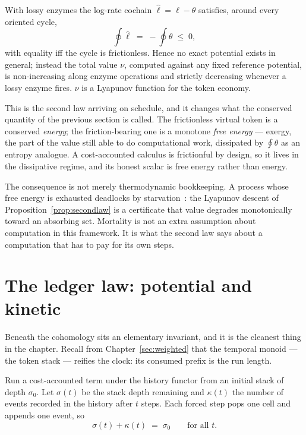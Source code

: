 \begin{proposition}
\label{prop:secondlaw}
With lossy enzymes the log-rate cochain $\hat\ell = \ell - \theta$
satisfies, around every oriented cycle,
\[
  \oint \hat\ell \;=\; -\oint \theta \;\leq\; 0,
\]
with equality iff the cycle is frictionless.  Hence no exact potential
exists in general; instead the total value $\nu$, computed against any
fixed reference potential, is non-increasing along enzyme operations and
strictly decreasing whenever a lossy enzyme fires.  $\nu$ is a Lyapunov
function for the token economy.
\end{proposition}

\begin{remark}
\label{rmk:exergy}
This is the second law arriving on schedule, and it changes what the
conserved quantity of the previous section is called.  The frictionless
virtual token is a conserved \emph{energy}; the friction-bearing one is a
monotone \emph{free energy} --- exergy, the part of the value still able
to do computational work, dissipated by $\oint\theta$ as an entropy
analogue.  A cost-accounted calculus is frictionful by design, so it lives
in the dissipative regime, and its honest scalar is free energy rather
than energy.

The consequence is not merely thermodynamic bookkeeping.  A process whose
free energy is exhausted deadlocks by starvation~\cite{MC}: the Lyapunov
descent of Proposition~\ref{prop:secondlaw} is a certificate that value
degrades monotonically toward an absorbing set.  Mortality is not an extra
assumption about computation in this framework.  It is what the second law
says about a computation that has to pay for its own steps.
\end{remark}

\section{The ledger law: potential and kinetic}

Beneath the cohomology sits an elementary invariant, and it is the
cleanest thing in the chapter.  Recall from Chapter~\ref{sec:weighted}
that the temporal monoid --- the token stack --- reifies the clock: its
consumed prefix is the run length.

\begin{proposition}
\label{thm:conservation}
Run a cost-accounted term under the history functor from an initial stack
of depth $\sigma_0$.  Let $\sigma(t)$ be the stack depth remaining and
$\kappa(t)$ the number of events recorded in the history after $t$ steps.
Each forced step pops one cell and appends one event, so
\[
  \sigma(t) + \kappa(t) \;=\; \sigma_0 \qquad \text{for all } t.
\]
\end{proposition}

